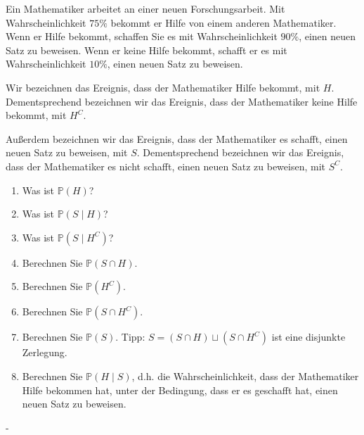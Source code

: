 \documentclass{article}
\begin{document}
\begin{problem}
Ein Mathematiker arbeitet an einer neuen Forschungsarbeit. Mit Wahrscheinlichkeit $75\%$ bekommt er Hilfe von einem anderen Mathematiker. Wenn er Hilfe bekommt, schaffen Sie es mit Wahrscheinlichkeit $90\%$, einen neuen Satz zu beweisen. Wenn er keine Hilfe bekommt, schafft er es mit Wahrscheinlichkeit $10\%$, einen neuen Satz zu beweisen.
\par
Wir bezeichnen das Ereignis, dass der Mathematiker Hilfe bekommt, mit $H$. Dementsprechend bezeichnen wir das Ereignis, dass der Mathematiker keine Hilfe bekommt, mit $H^C$.
\par
Außerdem bezeichnen wir das Ereignis, dass der Mathematiker es schafft, einen neuen Satz zu beweisen, mit $S$. Dementsprechend bezeichnen wir das Ereignis, dass der Mathematiker es nicht schafft, einen neuen Satz zu beweisen, mit $S^C$.
\begin{enumerate}
\item {
Was ist $\mathbb{P}(H)$?
}
\item {
Was ist $\mathbb{P}(S \mid H)$?
}
\item {
Was ist $\mathbb{P}(S \mid H^C)$?
}
\item {
Berechnen Sie $\mathbb{P}(S \cap H)$.
}
\item {
Berechnen Sie $\mathbb{P}(H^C)$.
}
\item {
Berechnen Sie $\mathbb{P}(S \cap H^C)$.
}
\item {
Berechnen Sie $\mathbb{P}(S)$. Tipp: $S = (S \cap H) \sqcup (S \cap H^C)$ ist eine disjunkte Zerlegung.
}
\item {
Berechnen Sie $\mathbb{P}(H \mid S)$, d.h. die Wahrscheinlichkeit, dass der Mathematiker Hilfe bekommen hat, unter der Bedingung, dass er es geschafft hat, einen neuen Satz zu beweisen.
}
\end{enumerate}
\end{problem}

\begin{solution}
-
\end{solution}
\end{document}
